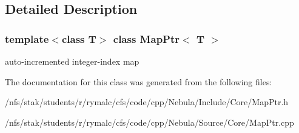 \subsection{Detailed Description}
\subsubsection*{template$<$class T$>$ class MapPtr$<$ T $>$}

auto-\/incremented integer-\/index map 

The documentation for this class was generated from the following files:\begin{DoxyCompactItemize}
\item 
/nfs/stak/students/r/rymalc/cfs/code/cpp/Nebula/Include/Core/MapPtr.h\item 
/nfs/stak/students/r/rymalc/cfs/code/cpp/Nebula/Source/Core/MapPtr.cpp\end{DoxyCompactItemize}
